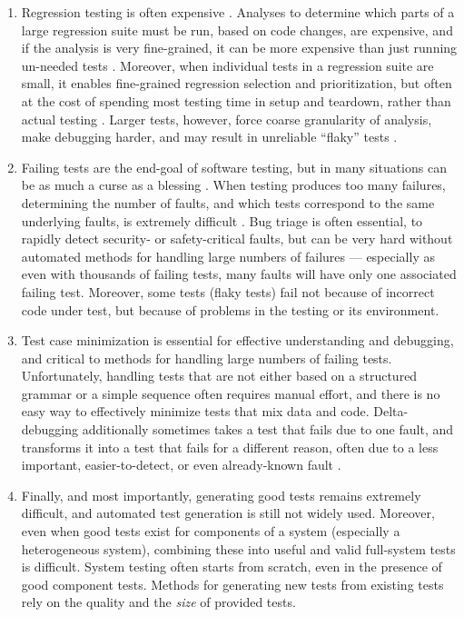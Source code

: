 \begin{enumerate}
\item Regression testing is often expensive
  \cite{YooHarman,rothermel01oct,SelectTest,Graves:2001:ESR:367008.367020,STVR:STVR263}.
  Analyses to determine which parts of a large regression suite must
  be run, based on code changes, are expensive, and if the analysis is
  very fine-grained, it can be more expensive than just running
  un-needed tests \cite{DarkoFSE}.  Moreover, when individual tests in
  a regression suite are small, it enables fine-grained regression
  selection and prioritization, but often at the cost of spending most
  testing time in setup and teardown, rather than actual testing
  \cite{KaiserBell}.  Larger tests, however, force coarse granularity
  of analysis,
  make debugging harder, and may result in unreliable ``flaky'' tests \cite{miccoflaky,listfieldtestanalysis}.

\item Failing tests are the end-goal of software testing, but in many
  situations can be as much a curse as a blessing \cite{PLDI13,OneTest}.  When testing produces too many failures, determining the number of
  faults, and which tests correspond to the same underlying faults, is
  extremely difficult \cite{Podgurski03,Podgurski04}.  Bug triage is often essential, to rapidly
  detect security- or safety-critical faults, but can be very hard
  without automated methods for handling large numbers of failures ---
  especially as even with thousands of failing tests, many faults will
  have only one associated failing test.  Moreover, some tests (flaky
  tests) fail not because of incorrect code under test, but because of
  problems in the testing or its environment.

\item Test case minimization \cite{DD,TCminim,CReduce} is essential
  for effective understanding and debugging, and critical to methods
  for handling large numbers of failing tests.  Unfortunately, handling tests that
  are not either based on a structured grammar or a simple sequence often requires manual effort, and there
  is no easy way to effectively minimize tests that mix data and code.
  Delta-debugging additionally sometimes takes a test that fails due to one fault, and transforms it into a test that
  fails for a different reason, often due to a less important,
  easier-to-detect, or even already-known fault \cite{slippageFSE}.

\item Finally, and most importantly, generating good tests remains
  extremely difficult, and automated test generation is still not
  widely used.  Moreover, even when good tests exist for components of
  a system (especially a heterogeneous system), combining these into
  useful and valid full-system tests is difficult.  System testing
  often starts from scratch, even in the presence of good component
  tests.  Methods for generating new tests from existing tests rely
  on the quality and the \emph{size} \cite{issta14} of provided tests.
\end{enumerate}

